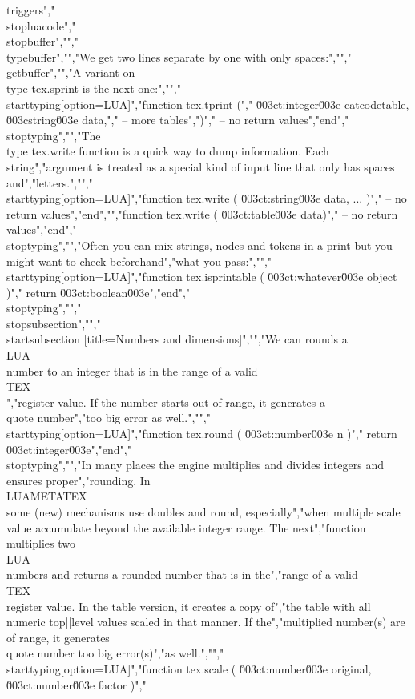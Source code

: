 triggers","\\stopluacode","\\stopbuffer","","\\typebuffer","","We get two lines separate by one with only spaces:","","\\getbuffer","","A variant on \\type {tex.sprint} is the next one:","","\\starttyping[option=LUA]","function tex.tprint (","     { \u003ct:integer\u003e catcodetable, \u003cstring\u003e data},","    -- more tables",")","    -- no return values","end","\\stoptyping","","The \\type {tex.write} function is a quick way to dump information. Each string","argument is treated as a special kind of input line that only has spaces and","letters.","","\\starttyping[option=LUA]","function tex.write ( \u003ct:string\u003e data, ... )","    -- no return values","end","","function tex.write ( \u003ct:table\u003e data)","    -- no return values","end","\\stoptyping","","Often you can mix strings, nodes and tokens in a print but you might want to check beforehand","what you pass:","","\\starttyping[option=LUA]","function tex.isprintable ( \u003ct:whatever\u003e object )","    return \u003ct:boolean\u003e","end","\\stoptyping","","\\stopsubsection","","\\startsubsection [title=Numbers and dimensions]","","We can rounds a \\LUA\\ number to an integer that is in the range of a valid \\TEX\\","register value. If the number starts out of range, it generates a \\quote {number","too big} error as well.","","\\starttyping[option=LUA]","function tex.round ( \u003ct:number\u003e n )","    return \u003ct:integer\u003e","end","\\stoptyping","","In many places the engine multiplies and divides integers and ensures proper","rounding. In \\LUAMETATEX\\ some (new) mechanisms use doubles and round, especially","when multiple scale value accumulate beyond the available integer range. The next","function multiplies two \\LUA\\ numbers and returns a rounded number that is in the","range of a valid \\TEX\\ register value. In the table version, it creates a copy of","the table with all numeric top||level values scaled in that manner. If the","multiplied number(s) are of range, it generates \\quote {number too big} error(s)","as well.","","\\starttyping[option=LUA]","function tex.scale ( \u003ct:number\u003e original, \u003ct:number\u003e factor )","    